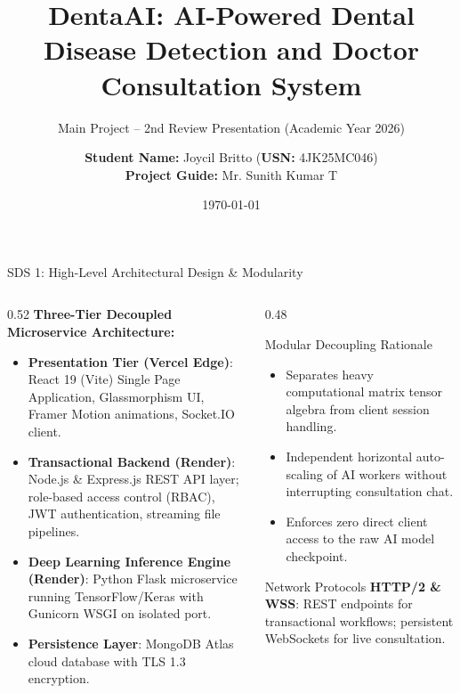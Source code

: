 \documentclass[aspectratio=169, 10pt]{beamer}
\title[\textbf{DentaAI - 2nd Review}]{\textbf{DentaAI: AI-Powered Dental Disease Detection and Doctor Consultation System}}
\subtitle{Main Project -- 2nd Review Presentation (Academic Year 2026)}
\author[\textbf{Joycil Britto}]{\textbf{Student Name:} Joycil Britto \quad (\textbf{USN:} 4JK25MC046)\\[1ex]
\small \textbf{Project Guide:} Mr. Sunith Kumar T}
\institute[\textbf{Department of MCA}]{\small Department of Master of Computer Applications (MCA)\\[0.5ex] \textbf{Review Dates:} November 04 \& 05, 2026}
\date{\today}
\begin{document}
\begin{frame}[plain]
    \titlepage
\end{frame}

\begin{frame}{SDS 1: High-Level Architectural Design \& Modularity}
\begin{columns}[T]
    \begin{column}{0.52\textwidth}
        \textbf{Three-Tier Decoupled Microservice Architecture:}
        \begin{itemize}
            \item \textbf{Presentation Tier (Vercel Edge)}:
            React 19 (Vite) Single Page Application, Glassmorphism UI, Framer Motion animations, Socket.IO client.
            \item \textbf{Transactional Backend (Render)}:
            Node.js \& Express.js REST API layer; role-based access control (RBAC), JWT authentication, streaming file pipelines.
            \item \textbf{Deep Learning Inference Engine (Render)}:
            Python Flask microservice running TensorFlow/Keras with Gunicorn WSGI on isolated port.
            \item \textbf{Persistence Layer}:
            MongoDB Atlas cloud database with TLS 1.3 encryption.
        \end{itemize}
    \end{column}
    \begin{column}{0.48\textwidth}
        \begin{block}{Modular Decoupling Rationale}
            \small
            \begin{itemize}
                \item Separates heavy computational matrix tensor algebra from client session handling.
                \item Independent horizontal auto-scaling of AI workers without interrupting consultation chat.
                \item Enforces zero direct client access to the raw AI model checkpoint.
            \end{itemize}
        \end{block}
        \begin{exampleblock}{Network Protocols}
            \small \textbf{HTTP/2 \& WSS}: REST endpoints for transactional workflows; persistent WebSockets for live consultation.
        \end{exampleblock}
    \end{column}
\end{columns}
\end{frame}
\end{document}
